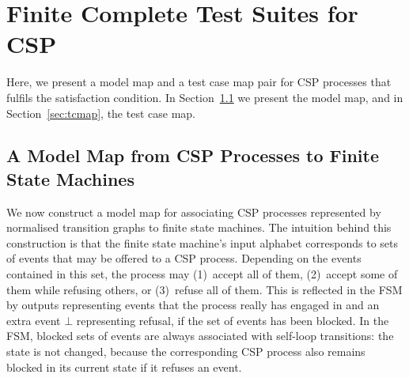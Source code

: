 \section{Finite Complete Test Suites for CSP}
\label{sec:finitecomplete}

Here, we present a model map and a test case map pair for CSP processes that
fulfils the satisfaction condition. In Section~\ref{sec:mmap} we present the
model map, and in Section~\ref{sec:tcmap}, the test case map.

\subsection{A Model Map from CSP Processes to Finite State Machines}
\label{sec:mmap}

We now construct a model map for associating CSP processes represented by
normalised transition graphs to finite state machines. The intuition behind
this construction is that the finite state machine's input alphabet
corresponds to sets of events that may be offered to a CSP process. Depending
on the events contained in this set, the process may (1)~accept all of them,
(2)~accept some of them while refusing others, or (3)~refuse all of them.
This is reflected in the FSM by outputs   representing events that the
process really has engaged in and an extra event $\bot$ representing refusal,
if the set of events has been blocked. In the FSM, blocked sets of events are
always associated with self-loop transitions: the state is not changed,
because the corresponding CSP process also remains blocked in its current
state if it refuses an event.

